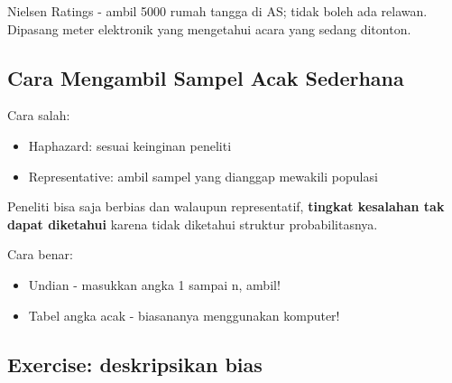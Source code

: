 \documentclass[
  letterpaper,
  DIV=11,
  numbers=noendperiod]{scrreprt}
\providecommand{\tightlist}{%
  \setlength{\itemsep}{0pt}\setlength{\parskip}{0pt}}\usepackage{longtable,booktabs,array}
\begin{document}
Nielsen Ratings - ambil 5000 rumah tangga di AS; tidak boleh ada
relawan. Dipasang meter elektronik yang mengetahui acara yang sedang
ditonton.

\hypertarget{cara-mengambil-sampel-acak-sederhana}{%
\subsection{Cara Mengambil Sampel Acak
Sederhana}\label{cara-mengambil-sampel-acak-sederhana}}

Cara salah:

\begin{itemize}
\tightlist
\item
  Haphazard: sesuai keinginan peneliti
\item
  Representative: ambil sampel yang dianggap mewakili populasi
\end{itemize}

Peneliti bisa saja berbias dan walaupun representatif, \textbf{tingkat
kesalahan tak dapat diketahui} karena tidak diketahui struktur
probabilitasnya.

Cara benar:

\begin{itemize}
\tightlist
\item
  Undian - masukkan angka 1 sampai n, ambil!
\item
  Tabel angka acak - biasananya menggunakan komputer!
\end{itemize}

\hypertarget{exercise-deskripsikan-bias}{%
\subsection{Exercise: deskripsikan
bias}\label{exercise-deskripsikan-bias}}
\end{document}
